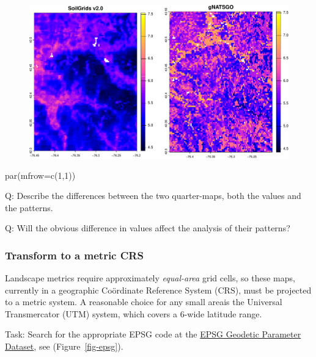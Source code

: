 \documentclass[
  letterpaper,
  DIV=11,
  numbers=noendperiod]{scrartcl}
\newenvironment{Shaded}{\begin{snugshade}}{\end{snugshade}}
\newcommand{\AttributeTok}[1]{\textcolor[rgb]{0.40,0.45,0.13}{#1}}
\newcommand{\DecValTok}[1]{\textcolor[rgb]{0.68,0.00,0.00}{#1}}
\newcommand{\FunctionTok}[1]{\textcolor[rgb]{0.28,0.35,0.67}{#1}}
\newcommand{\NormalTok}[1]{\textcolor[rgb]{0.00,0.23,0.31}{#1}}
\begin{document}
\begin{figure}[H]

{\centering \includegraphics{PatternAnalysisWorkshopTutorial_files/figure-pdf/crop.2-1.pdf}

}

\end{figure}

\begin{Shaded}
\begin{Highlighting}[]
\FunctionTok{par}\NormalTok{(}\AttributeTok{mfrow=}\FunctionTok{c}\NormalTok{(}\DecValTok{1}\NormalTok{,}\DecValTok{1}\NormalTok{))}
\end{Highlighting}
\end{Shaded}

Q: Describe the differences between the two quarter-maps, both the
values and the patterns.

Q: Will the obvious difference in values affect the analysis of their
patterns?

\hypertarget{transform-to-a-metric-crs}{%
\subsubsection{Transform to a metric
CRS}\label{transform-to-a-metric-crs}}

Landscape metrics require approximately \emph{equal-area} grid cells, so
these maps, currently in a geographic Coördinate Reference System (CRS),
must be projected to a metric system. A reasonable choice for any small
areais the Universal Transmercator (UTM) system, which covers a
6\textdegree-wide latitude range.

Task: Search for the appropriate EPSG code at the
\href{https://epsg.org}{EPSG Geodetic Parameter Dataset}, see
(Figure~\ref{fig-epsg}).
\end{document}
